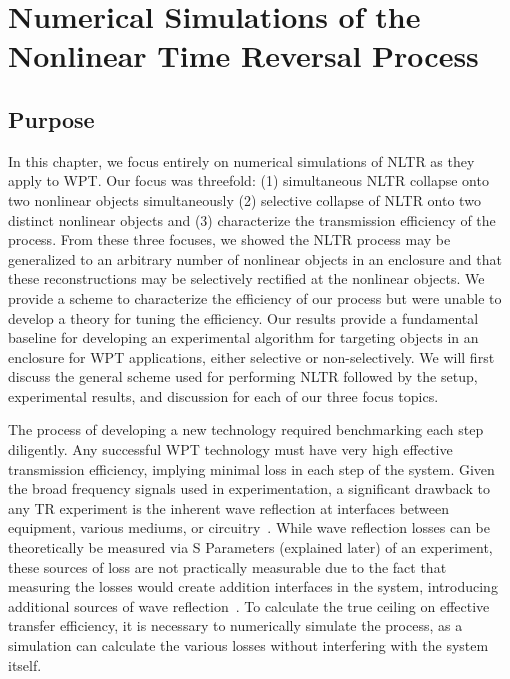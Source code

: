 \chapter{Numerical Simulations of the Nonlinear Time Reversal Process}
\label{ch:numerical}

\section{Purpose}
\label{sec:numerical-purpose}

In this chapter, we focus entirely on numerical simulations of NLTR as they apply to WPT. Our focus was threefold: (1) simultaneous NLTR collapse onto two nonlinear objects simultaneously (2) selective collapse of NLTR onto two distinct nonlinear objects and (3) characterize the transmission efficiency of the process. From these three focuses, we showed the NLTR process may be generalized to an arbitrary number of nonlinear objects in an enclosure and that these reconstructions may be selectively rectified at the nonlinear objects. We provide a scheme to characterize the efficiency of our process but were unable to develop a theory for tuning the efficiency. Our results provide a fundamental baseline for developing an experimental algorithm for targeting objects in an enclosure for WPT applications, either selective or non-selectively.  We will first discuss the general scheme used for performing NLTR followed by the setup, experimental results, and discussion for each of our three focus topics.

The process of developing a new technology required benchmarking each step diligently. Any successful WPT technology must have very high effective transmission efficiency, implying minimal loss in each step of the system. Given the broad frequency signals used in experimentation, a significant drawback to any TR experiment is the inherent wave reflection at interfaces between equipment, various mediums, or circuitry~\cite{smith_waves_2010,griffiths_david_introduction_1999}. While wave reflection losses can be theoretically be measured via S Parameters (explained later) of an experiment, these sources of loss are not practically measurable due to the fact that measuring the losses would create addition interfaces in the system, introducing additional sources of wave reflection~\cite{smith_waves_2010}. To calculate the true ceiling on effective transfer efficiency, it is necessary to numerically simulate the process, as a simulation can calculate the various losses without interfering with the system itself.

